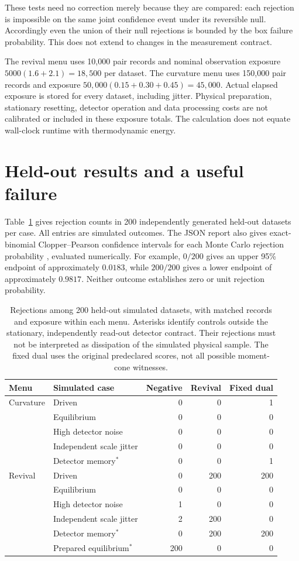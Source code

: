 These tests need no correction merely because they are compared: each
rejection is impossible on the same joint confidence event under its
reversible null. Accordingly even the union of their null rejections is
bounded by the box failure probability. This does not extend to changes in
the measurement contract.

The revival menu uses 10,000 pair records and nominal observation exposure
$5000(1.6+2.1)=18,500$ per dataset. The curvature menu uses 150,000 pair
records and exposure $50,000(0.15+0.30+0.45)=45,000$. Actual elapsed exposure
is stored for every dataset, including jitter. Physical preparation,
stationary resetting, detector operation and data processing costs are not
calibrated or included in these exposure totals. The calculation does not
equate wall-clock runtime with thermodynamic energy.

\section{Held-out results and a useful failure}

Table~\ref{tab:vl-thermodynamic} gives rejection counts in 200 independently
generated held-out datasets per case. All entries are simulated outcomes.
The JSON report also gives exact-binomial Clopper--Pearson confidence
intervals for each Monte Carlo rejection probability
\cite{vlClopper1934}, evaluated numerically. For example, $0/200$ gives an
upper 95\% endpoint of approximately $0.0183$, while $200/200$ gives a lower
endpoint of approximately $0.9817$. Neither outcome establishes zero or
unit rejection probability.

\begin{table}[ht]
\centering
\small
\begin{tabular}{llrrr}
\hline
Menu & Simulated case & Negative & Revival & Fixed dual\\
\hline
Curvature & Driven & 0 & 0 & 1\\
 & Equilibrium & 0 & 0 & 0\\
 & High detector noise & 0 & 0 & 0\\
 & Independent scale jitter & 0 & 0 & 0\\
 & Detector memory$^*$ & 0 & 0 & 1\\
Revival & Driven & 0 & 200 & 200\\
 & Equilibrium & 0 & 0 & 0\\
 & High detector noise & 1 & 0 & 0\\
 & Independent scale jitter & 2 & 200 & 0\\
 & Detector memory$^*$ & 0 & 200 & 200\\
 & Prepared equilibrium$^*$ & 200 & 0 & 0\\
\hline
\end{tabular}
\caption{Rejections among 200 held-out simulated datasets, with matched
records and exposure within each menu. Asterisks identify controls outside
the stationary, independently read-out detector contract. Their rejections
must not be interpreted as dissipation of the simulated physical sample.
The fixed dual uses the original predeclared scores, not all possible
moment-cone witnesses.}
\label{tab:vl-thermodynamic}
\end{table}

